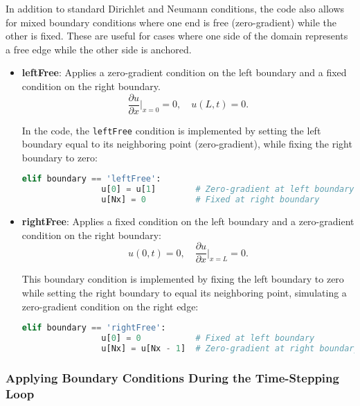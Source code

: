 \documentclass{article}
\begin{document}
		In addition to standard Dirichlet and Neumann conditions, the code also allows for mixed boundary conditions where one end is free (zero-gradient) while the other is fixed. These are useful for cases where one side of the domain represents a free edge while the other side is anchored.
		
		\begin{itemize}
			\item \textbf{leftFree}: Applies a zero-gradient condition on the left boundary and a fixed condition on the right boundary.
		    \begin{equation}
			\frac{\partial u}{\partial x}\Big|_{x=0} = 0, \quad u(L, t) = 0.
		\end{equation}
		
		In the code, the \texttt{leftFree} condition is implemented by setting the left boundary equal to its neighboring point (zero-gradient), while fixing the right boundary to zero:
		
		\begin{lstlisting}[language=Python, caption=Left-Free Boundary Condition]
			elif boundary == 'leftFree':
				u[0] = u[1]        # Zero-gradient at left boundary
				u[Nx] = 0          # Fixed at right boundary
		\end{lstlisting}
		
		\item \textbf{rightFree}: Applies a fixed condition on the left boundary and a zero-gradient condition on the right boundary:
		\begin{equation}
			u(0, t) = 0, \quad \frac{\partial u}{\partial x}\Big|_{x=L} = 0.
		\end{equation}
		
		This boundary condition is implemented by fixing the left boundary to zero while setting the right boundary to equal its neighboring point, simulating a zero-gradient condition on the right edge:
		
		\begin{lstlisting}[language=Python, caption=Right-Free Boundary Condition]
			elif boundary == 'rightFree':
				u[0] = 0           # Fixed at left boundary
				u[Nx] = u[Nx - 1]  # Zero-gradient at right boundary
		\end{lstlisting}
		\end{itemize}
		
		
		\subsubsection{Applying Boundary Conditions During the Time-Stepping Loop}
		
\end{document}
